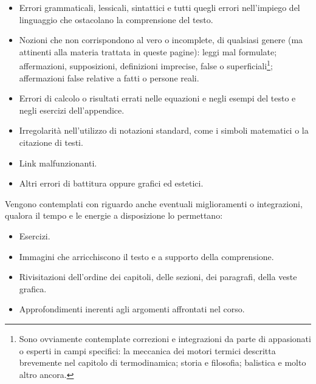 \begin{itemize}
    \item Errori grammaticali, lessicali, sintattici e tutti quegli errori nell'impiego
    del linguaggio che ostacolano la comprensione del testo.

    \item Nozioni che non corrispondono al vero o incomplete, di qualsiasi genere (ma
    attinenti alla materia trattata in queste pagine):
    leggi mal formulate; affermazioni, supposizioni, definizioni imprecise, false o
    superficiali\footnote{Sono ovviamente contemplate correzioni e integrazioni da parte di appasionati
    o esperti in campi specifici: la meccanica dei motori termici descritta brevemente
    nel capitolo di termodinamica; storia e filosofia; balistica e molto altro ancora.}; affermazioni false
    relative a fatti o persone reali.

    \item Errori di calcolo o risultati errati nelle equazioni e negli esempi del testo e negli
    esercizi dell'appendice.

    \item Irregolarità nell'utilizzo di notazioni standard, come i simboli matematici
    o la citazione di testi.

    \item Link malfunzionanti.
    
    \item Altri errori di battitura oppure grafici ed estetici.
\end{itemize}

Vengono contemplati con riguardo anche eventuali miglioramenti o integrazioni,
qualora il tempo e le energie a disposizione lo permettano:

\begin{itemize}
    \item Esercizi.
    \item Immagini che arricchiscono il testo e a supporto della comprensione.
    \item Rivisitazioni dell'ordine dei capitoli, delle sezioni, dei paragrafi, della veste grafica.
    \item Approfondimenti inerenti agli argomenti affrontati nel corso.
\end{itemize}